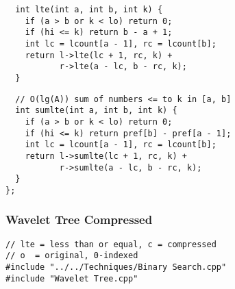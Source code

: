 \documentclass[twoside]{article}
\begin{document}
\begin{multicols*}{2}
\begin{verbatim}
  int lte(int a, int b, int k) {
    if (a > b or k < lo) return 0;
    if (hi <= k) return b - a + 1;
    int lc = lcount[a - 1], rc = lcount[b];
    return l->lte(lc + 1, rc, k) +
           r->lte(a - lc, b - rc, k);
  }
\end{verbatim}
\vspace{-12pt}
\begin{verbatim}
  // O(lg(A)) sum of numbers <= to k in [a, b]
  int sumlte(int a, int b, int k) {
    if (a > b or k < lo) return 0;
    if (hi <= k) return pref[b] - pref[a - 1];
    int lc = lcount[a - 1], rc = lcount[b];
    return l->sumlte(lc + 1, rc, k) +
           r->sumlte(a - lc, b - rc, k);
  }
};
\end{verbatim}

\subsubsectionfont{\large\bfseries\sffamily\underline}
\subsubsection*{Wavelet Tree Compressed}
\begin{verbatim}
// lte = less than or equal, c = compressed
// o  = original, 0-indexed
#include "../../Techniques/Binary Search.cpp"
#include "Wavelet Tree.cpp"


\end{verbatim}
\end{multicols*}
\end{document}
